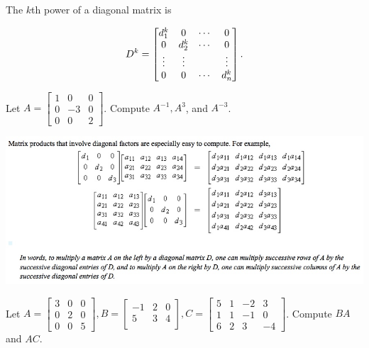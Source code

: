 \documentclass[12pt,letterpaper,reqno]{article}
\numberwithin{equation}{section}
\begin{document}
The $k$th power of a diagonal matrix is

\begin{equation}\label{eq:inverse_diagonal_matrix}
	D^k=\begin{bmatrix}
		d_1^k & 0 & \cdots & 0 \\
		0 & d_2^k & \cdots & 0 \\
		\vdots & \vdots & \hspace{0.25cm} & \vdots \\
		0 & 0 & \cdots & d_n^k
	\end{bmatrix}.
\end{equation}

\begin{exercise}
Let $A=\begin{bmatrix}
		1 & 0 & 0 \\ 0 & -3 & 0 \\ 0 & 0 & 2
	\end{bmatrix}$. Compute $A^{-1}, A^3$, and $A^{-3}$.
\end{exercise}

\includegraphics[scale=0.55]{figures_mvc/Mult_by_Diagonal_Matrix}

\begin{exercise}
Let $A=\begin{bmatrix}
	3 & 0 & 0 \\ 0 & 2 & 0 \\ 0 & 0 & 5
\end{bmatrix}, B=\begin{bmatrix}
	-1 & 2 & 0 \\ 5 & 3 & 4 \\ 
\end{bmatrix}, C=\begin{bmatrix}
	5 & 1 & -2 & 3 \\ 1 & 1 & -1 & 0 \\ 
	6 & 2 & 3 & -4
\end{bmatrix}$. Compute $BA$ and $AC$.
\end{exercise}
\end{document}
